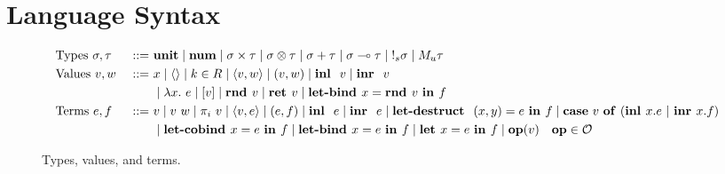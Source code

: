 \section{Language Syntax}

\begin{figure}[tbp]
  \begin{alignat*}{3}
         &\text{Types } \sigma, \tau &::=~ &\mathbf{unit}
         \mid \textbf{num}
         \mid \sigma \times \tau 
         \mid \sigma \otimes \tau
         \mid \sigma + \tau 
         \mid \sigma \multimap \tau
         \mid {{!_{s}} \sigma}
         \mid {M_u \tau}
         \\
         &\text{Values } v, w \ &::=~ &x
         \mid \langle \rangle
         \mid k \in R
         \mid \langle v,w \rangle 
         \mid  (v, w)
         \mid \textbf{inl } \ v
         \mid \textbf{inr } \ v
         \\
         & & & \mid \lambda x.~e 
         \mid [v]
         \mid\textbf{rnd } v
         \mid {\textbf{ret }v} 
         \mid \textbf{let-bind } x = \textbf{rnd } v \ \textbf{in } f \\
         &\text{Terms } e, f &::=~ & v
	\mid v~w
         \mid {\pi}_i\ v
         \mid \langle v,e \rangle 
         \mid  (e, f)
         \mid \textbf{inl } \ e
         \mid \textbf{inr } \ e
         \mid \textbf{let-destruct } \ (x,y) = e \ \textbf{in } f
         \mid \mathbf{case} \ v \ \mathbf{of} \ (\textbf{inl } x.e \ | \ \textbf{inr } x.f) 
         \\
         & & & \mid
          \textbf{let-cobind } x = e \ \textbf{in }  f
         \mid {\textbf{let-bind }x = e \ \textbf{in }f} 
         \mid \textbf{let } x  = e \ \textbf{in }  f 
         \mid \mathbf{op}(v) \quad \mathbf{op} \in \mathcal{O}
  \end{alignat*}
  \caption{Types, values, and terms.}
  \label{fig:syntax}
\end{figure}


